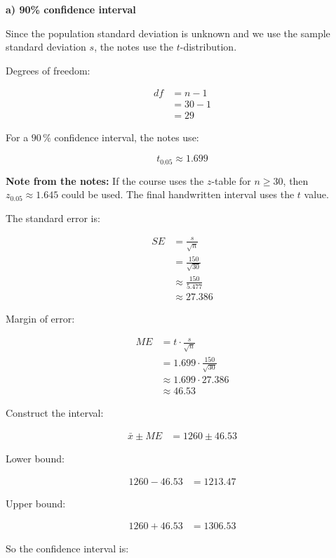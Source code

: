 \documentclass[10pt]{article}
\begin{document}
\textbf{a) 90\% confidence interval}

Since the population standard deviation is unknown and we use
the sample standard deviation $s$, the notes use the
$t$-distribution.

Degrees of freedom:

\begin{align*}
df
&=n-1 \\[2mm]
&=30-1 \\[2mm]
&=29
\end{align*}

For a $90\,\%$ confidence interval, the notes use:

\[
t_{0.05}\approx 1.699
\]

\textbf{Note from the notes:}
If the course uses the $z$-table for $n\geq 30$, then
$z_{0.05}\approx 1.645$ could be used.
The final handwritten interval uses the $t$ value.

The standard error is:

\begin{align*}
SE
&=
\frac{s}{\sqrt{n}} \\[2mm]
&=
\frac{150}{\sqrt{30}} \\[2mm]
&\approx
\frac{150}{5.477} \\[2mm]
&\approx 27.386
\end{align*}

Margin of error:

\begin{align*}
ME
&=
t\cdot \frac{s}{\sqrt{n}} \\[2mm]
&=
1.699\cdot
\frac{150}{\sqrt{30}} \\[2mm]
&\approx
1.699\cdot 27.386 \\[2mm]
&\approx 46.53
\end{align*}

Construct the interval:

\begin{align*}
\bar{x}\pm ME
&=
1260\pm 46.53
\end{align*}

Lower bound:

\begin{align*}
1260-46.53
&=1213.47
\end{align*}

Upper bound:

\begin{align*}
1260+46.53
&=1306.53
\end{align*}

So the confidence interval is:
\end{document}
